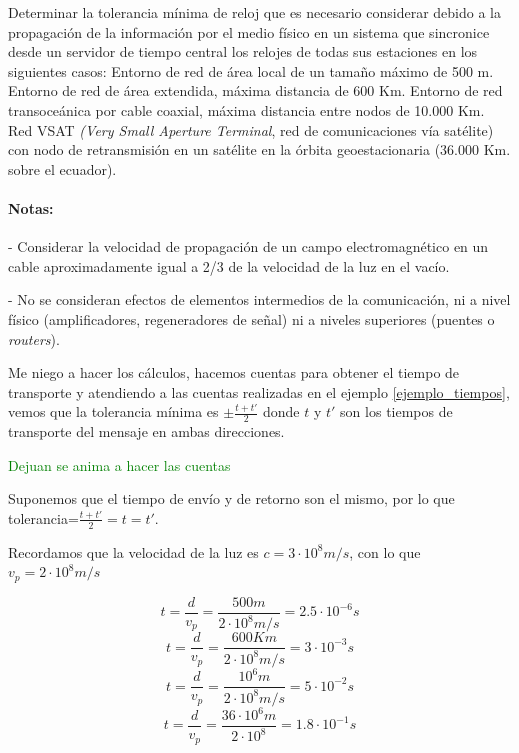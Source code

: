   \begin{problem}[11]
  Determinar la tolerancia mínima de reloj que es necesario considerar
  debido a la propagación de la información por el medio físico en un sistema
  que sincronice desde un servidor de tiempo central los relojes de todas
  sus estaciones en los siguientes casos:
    \ppart Entorno de red de área local de un tamaño máximo de 500 m.
    \ppart Entorno de red de área extendida, máxima distancia de 600 Km.
    \ppart Entorno de red transoceánica por cable coaxial, máxima distancia entre
nodos de 10.000 Km.
    \ppart Red VSAT \textit{(Very Small Aperture Terminal}, red de comunicaciones vía
satélite) con nodo de retransmisión en un satélite en la órbita geoestacionaria
(36.000 Km. sobre el ecuador).
  \paragraph{Notas: }
  - Considerar la velocidad de propagación de un campo electromagnético
en un cable aproximadamente igual a 2/3 de la velocidad de la luz en el
vacío.

  - No se consideran efectos de elementos intermedios de la comunicación,
  ni a nivel físico (amplificadores,  regeneradores de señal) ni a niveles
  superiores (puentes o \textit{routers}).

  \solution

  \yoP

  Me niego a hacer los cálculos, hacemos cuentas para obtener el tiempo de transporte y atendiendo a las cuentas realizadas en el ejemplo \ref{ejemplo_tiempos}, vemos que la tolerancia mínima es $\pm\frac{t+t'}{2}$ donde $t$ y $t'$ son los tiempos de transporte del mensaje en ambas direcciones.

\textcolor{green}{Dejuan se anima a hacer las cuentas}

Suponemos que el tiempo de envío y de retorno son el mismo, por lo que tolerancia=$\frac{t+t'}{2}=t=t'$.

Recordamos que la velocidad de la luz es $c=3·10^8 m/s$, con lo que $v_p=2·10^8m/s$


\spart
\[
t = \frac{d}{v_p} = \frac{500m}{2·10^8m/s} = 2.5·10^{-6}  s
\]
\spart
\[
t = \frac{d}{v_p} = \frac{600Km}{2·10^8m/s} = 3·10^{-3} s
\]
\spart
\[
t = \frac{d}{v_p} = \frac{10^6m}{2·10^8m/s} = 5·10^{-2} s
\]
\spart
\[
t = \frac{d}{v_p} = \frac{36·10^6m}{2·10^8} =  1.8·10^{-1} s
\]
  \end{problem}

